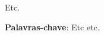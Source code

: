 %
%

\begin{RESUMO}
\thispagestyle{empty}
	
		\noindent Etc.

		\vspace*{0.5cm}\noindent\textbf{Palavras-chave}: Etc etc.
		

\end{RESUMO}


